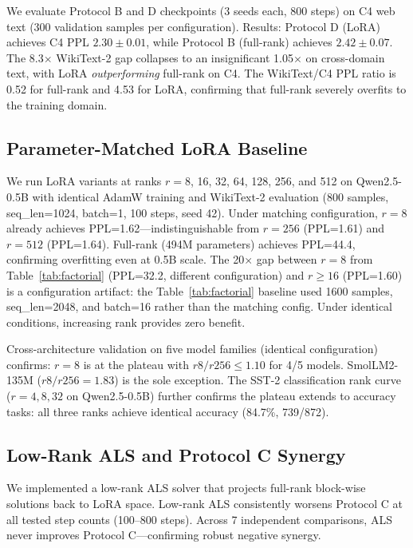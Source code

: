 \documentclass[11pt]{article}
\begin{document}
We evaluate Protocol B and D checkpoints (3 seeds each, 800 steps) on C4 web text (300 validation samples per configuration). Results: Protocol D (LoRA) achieves C4 PPL $2.30 \pm 0.01$, while Protocol B (full-rank) achieves $2.42 \pm 0.07$. The 8.3$\times$ WikiText-2 gap collapses to an insignificant 1.05$\times$ on cross-domain text, with LoRA \textit{outperforming} full-rank on C4. The WikiText/C4 PPL ratio is 0.52 for full-rank and 4.53 for LoRA, confirming that full-rank severely overfits to the training domain.

\subsection{Parameter-Matched LoRA Baseline}

We run LoRA variants at ranks $r=8$, 16, 32, 64, 128, 256, and 512 on Qwen2.5-0.5B with identical AdamW training and WikiText-2 evaluation (800 samples, seq\_len=1024, batch=1, 100 steps, seed 42). Under matching configuration, $r=8$ already achieves PPL=1.62---indistinguishable from $r=256$ (PPL=1.61) and $r=512$ (PPL=1.64). Full-rank (494M parameters) achieves PPL=44.4, confirming overfitting even at 0.5B scale. The 20$\times$ gap between $r=8$ from Table~\ref{tab:factorial} (PPL=32.2, different configuration) and $r \geq 16$ (PPL=1.60) is a configuration artifact: the Table~\ref{tab:factorial} baseline used 1600 samples, seq\_len=2048, and batch=16 rather than the matching config. Under identical conditions, increasing rank provides zero benefit.

Cross-architecture validation on five model families (identical configuration) confirms: $r=8$ is at the plateau with $r8/r256 \leq 1.10$ for 4/5 models. SmolLM2-135M ($r8/r256=1.83$) is the sole exception. The SST-2 classification rank curve ($r=4,8,32$ on Qwen2.5-0.5B) further confirms the plateau extends to accuracy tasks: all three ranks achieve identical accuracy (84.7\%, 739/872).

\subsection{Low-Rank ALS and Protocol C Synergy}

We implemented a low-rank ALS solver that projects full-rank block-wise solutions back to LoRA space. Low-rank ALS consistently worsens Protocol C at all tested step counts (100--800 steps). Across 7 independent comparisons, ALS never improves Protocol C---confirming robust negative synergy.
\end{document}
